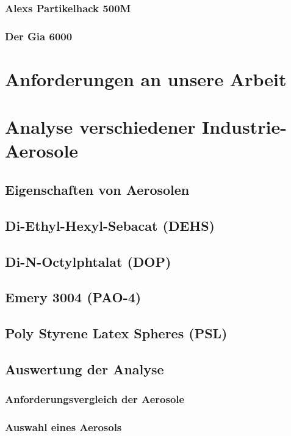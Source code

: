 \subsection{Alexs Partikelhack 500M}
\subsection{Der Gia 6000}


%

\chapter{Anforderungen an unsere Arbeit}\label{ch:platform}
%

\chapter{Analyse verschiedener Industrie-Aerosole}\label{ch:work}
\section{Eigenschaften von Aerosolen}
\section{Di-Ethyl-Hexyl-Sebacat (DEHS)}
\section{Di-N-Octylphtalat (DOP)}
\section{Emery 3004 (PAO-4)}
\section{Poly Styrene Latex Spheres (PSL)}
\section{Auswertung der Analyse}
\subsection{Anforderungsvergleich der Aerosole}
\subsection{Auswahl eines Aerosols}

